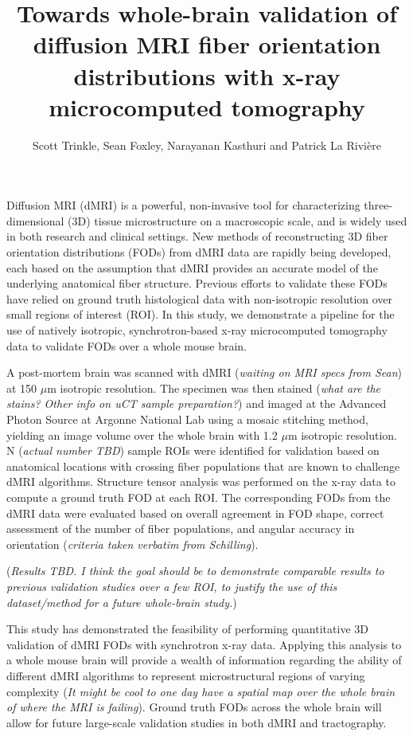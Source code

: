 \documentclass[11pt]{article}
\title{Towards whole-brain validation of diffusion MRI fiber orientation
  distributions with x-ray microcomputed tomography}
\author{Scott Trinkle, Sean
  Foxley, Narayanan Kasthuri and Patrick La Rivi\`ere}
\date{}
\begin{document}
\maketitle

Diffusion MRI (dMRI) is a powerful, non-invasive tool for characterizing
three-dimensional (3D) tissue microstructure on a macroscopic scale, and is
widely used in both research and clinical settings. New methods of
reconstructing 3D fiber orientation distributions (FODs) from dMRI data are
rapidly being developed, each based on the assumption that dMRI provides an
accurate model of the underlying anatomical fiber structure. Previous efforts to
validate these FODs have relied on ground truth histological data with
non-isotropic resolution over small regions of interest (ROI). In this study, we
demonstrate a pipeline for the use of natively isotropic, synchrotron-based x-ray
microcomputed tomography data to validate FODs over a whole mouse brain.

A post-mortem brain was scanned with dMRI (\textit{waiting on MRI specs from
  Sean}) at 150 $\mu\text{m}$ isotropic resolution. The specimen was then
stained (\textit{what are the stains? Other info on uCT sample preparation?})
and imaged at the Advanced Photon Source at Argonne National Lab using a mosaic
stitching method, yielding an image volume over the whole brain with 1.2 $\mu$m
isotropic resolution. N (\textit{actual number TBD}) sample ROIs were identified
for validation based on anatomical locations with crossing fiber populations
that are known to challenge dMRI algorithms. Structure tensor analysis was
performed on the x-ray data to compute a ground truth FOD at each ROI. The
corresponding FODs from the dMRI data were evaluated based on overall agreement
in FOD shape, correct assessment of the number of fiber populations, and angular
accuracy in orientation (\textit{criteria taken verbatim from Schilling}).

(\textit{Results TBD. I think the goal should be to demonstrate comparable
  results to previous validation studies over a few ROI, to justify the use of
  this dataset/method for a future whole-brain study.})

This study has demonstrated the feasibility of performing quantitative 3D
validation of dMRI FODs with synchrotron x-ray data. Applying this analysis to a
whole mouse brain will provide a wealth of information regarding the ability of
different dMRI algorithms to represent microstructural regions of varying
complexity (\textit{It might be cool to one day have a spatial map over the whole
  brain of where the MRI is failing}). Ground truth FODs across the whole brain
will allow for future large-scale validation studies in both dMRI and
tractography.
\end{document}

